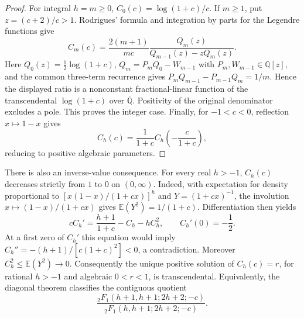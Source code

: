 \documentclass[11pt,a4paper]{article}
\theoremstyle{definition}
\theoremstyle{remark}
\numberwithin{equation}{section}
\begin{document}
\begin{proof}
For integral $h=m\ge0$, $C_0(c)=\log(1+c)/c$. If $m\ge1$, put
$z=(c+2)/c>1$. Rodrigues' formula and integration by parts for the
Legendre functions give
\[
 C_m(c)=\frac{2(m+1)}{mc}
          \frac{Q_m(z)}{Q_{m-1}(z)-zQ_m(z)}.
\]
Here $Q_0(z)=\tfrac12\log(1+c)$,
$Q_m=P_mQ_0-W_{m-1}$ with $P_m,W_{m-1}\in\mathbb Q[z]$, and the
common three-term recurrence gives
$P_mQ_{m-1}-P_{m-1}Q_m=1/m$. Hence the displayed ratio is a
nonconstant fractional-linear function of the transcendental
$\log(1+c)$ over $\overline{\mathbb Q}$. Positivity of the original
denominator excludes a pole. This proves the integer case.
Finally, for $-1<c<0$, reflection $x\mapsto1-x$ gives
\[
 C_h(c)=\frac1{1+c}C_h\!\left(-\frac c{1+c}\right),
\]
reducing to positive algebraic parameters.
\end{proof}

There is also an inverse-value consequence. For every real $h>-1$,
$C_h(c)$ decreases strictly from $1$ to $0$ on $(0,\infty)$.
Indeed, with expectation for density proportional to
$[x(1-x)/(1+cx)]^h$ and $Y=(1+cx)^{-1}$, the involution
$x\mapsto(1-x)/(1+cx)$ gives $\mathbb E(Y^2)=1/(1+c)$.
Differentiation then yields
\[
 cC_h'=\frac{h+1}{1+c}-C_h-hC_h^2,\qquad C_h'(0)=-\frac12.
\]
At a first zero of $C_h'$ this equation would imply
$C_h''=-(h+1)/[c(1+c)^2]<0$, a contradiction. Moreover
$C_h^2\le\mathbb E(Y^2)\to0$.
Consequently the unique positive solution of $C_h(c)=r$, for rational
$h>-1$ and algebraic $0<r<1$, is transcendental. Equivalently, the
diagonal theorem classifies the contiguous quotient
\[
 \frac{{}_2F_1(h+1,h+1;2h+2;-c)}
      {{}_2F_1(h,h+1;2h+2;-c)}.
\]
\end{document}
